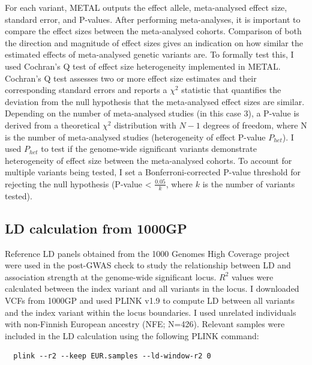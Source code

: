 For each variant, METAL outputs the effect allele, meta-analysed effect size, standard error, and P-values. After performing meta-analyses, it is important to compare the effect sizes between the meta-analysed cohorts. Comparison of both the direction and magnitude of effect sizes gives an indication on how similar the estimated effects of meta-analysed genetic variants are. To formally test this, I used Cochran's Q test of effect size heterogeneity implemented in METAL. Cochran's Q test assesses two or more effect size estimates and their corresponding standard errors and reports a $\chi^{2}$ statistic that quantifies the deviation from the null hypothesis that the meta-analysed effect sizes are similar. Depending on the number of meta-analysed studies (in this case 3), a P-value is derived from a theoretical $\chi^{2}$ distribution with $N-1$ degrees of freedom, where N is the number of meta-analysed studies (heterogeneity of effect P-value $P_{het}$). I used $P_{het}$ to test if the genome-wide significant variants demonstrate heterogeneity  of effect size between the meta-analysed cohorts. To account for multiple variants being tested, I set a Bonferroni-corrected P-value threshold for rejecting the null hypothesis (P-value < $\frac{0.05}{k}$, where $k$ is the number of variants tested).



\subsection{LD calculation from 1000GP}
Reference LD panels obtained from the 1000 Genomes High Coverage project \cite{1000gphc} were used in the post-GWAS check to study the relationship between LD and association strength at the genome-wide significant locus. $R^{2}$ values were calculated between the index variant and all variants in the locus. I downloaded VCFs from 1000GP and used PLINK v1.9 to compute LD between all variants and the index variant within the locus boundaries. I used unrelated individuals with non-Finnish European ancestry (NFE; N=426). Relevant samples were included in the LD calculation using the following PLINK command:
\begin{verbatim}
  plink --r2 --keep EUR.samples --ld-window-r2 0 
\end{verbatim}

